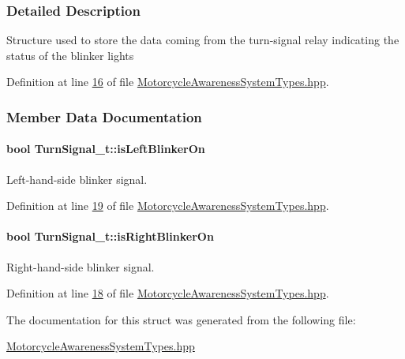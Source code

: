 \subsubsection{Detailed Description}
Structure used to store the data coming from the turn-\/signal relay indicating the status of the blinker lights 

Definition at line \hyperlink{MotorcycleAwarenessSystemTypes_8hpp_source_l00016}{16} of file \hyperlink{MotorcycleAwarenessSystemTypes_8hpp_source}{Motorcycle\-Awareness\-System\-Types.\-hpp}.



\subsubsection{Member Data Documentation}
\hypertarget{structTurnSignal__t_a7346ca64038ffb9b16cf2b22690dcae6}{
\paragraph[{is\-Left\-Blinker\-On}]{\setlength{\rightskip}{0pt plus 5cm}bool Turn\-Signal\-\_\-t\-::is\-Left\-Blinker\-On}}\label{structTurnSignal__t_a7346ca64038ffb9b16cf2b22690dcae6}


Left-\/hand-\/side blinker signal. 



Definition at line \hyperlink{MotorcycleAwarenessSystemTypes_8hpp_source_l00019}{19} of file \hyperlink{MotorcycleAwarenessSystemTypes_8hpp_source}{Motorcycle\-Awareness\-System\-Types.\-hpp}.

\hypertarget{structTurnSignal__t_a5b777c664220a398686d3a38661b4181}{
\paragraph[{is\-Right\-Blinker\-On}]{\setlength{\rightskip}{0pt plus 5cm}bool Turn\-Signal\-\_\-t\-::is\-Right\-Blinker\-On}}\label{structTurnSignal__t_a5b777c664220a398686d3a38661b4181}


Right-\/hand-\/side blinker signal. 



Definition at line \hyperlink{MotorcycleAwarenessSystemTypes_8hpp_source_l00018}{18} of file \hyperlink{MotorcycleAwarenessSystemTypes_8hpp_source}{Motorcycle\-Awareness\-System\-Types.\-hpp}.



The documentation for this struct was generated from the following file\-:\begin{DoxyCompactItemize}
\item 
\hyperlink{MotorcycleAwarenessSystemTypes_8hpp}{Motorcycle\-Awareness\-System\-Types.\-hpp}\end{DoxyCompactItemize}
